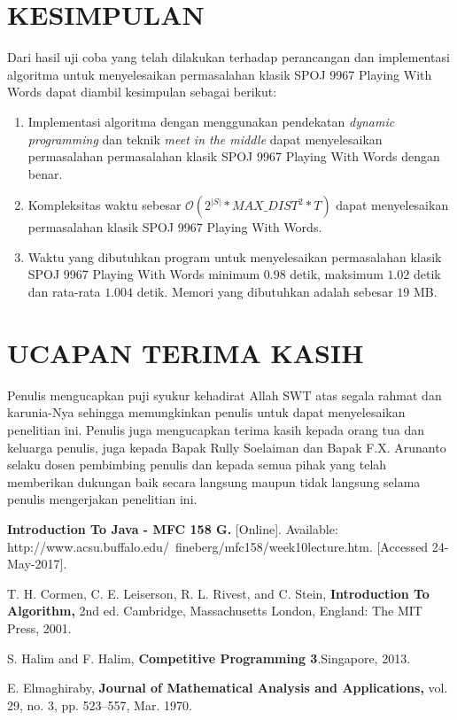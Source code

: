\documentclass[a4paper]{IEEEtran}
\begin{document}
\section{KESIMPULAN}

Dari hasil uji coba yang telah dilakukan terhadap perancangan dan implementasi algoritma untuk menyelesaikan permasalahan klasik SPOJ 9967 Playing With Words dapat diambil kesimpulan sebagai berikut:

\begin{enumerate}
	\item Implementasi algoritma dengan menggunakan pendekatan \textit{dynamic programming} dan teknik \textit{meet in the middle} dapat menyelesaikan permasalahan permasalahan klasik SPOJ 9967 Playing With Words dengan benar.
	\item Kompleksitas waktu sebesar $ \mathcal{O}(2^{|S|} * MAX\_DIST^{2} * T) $ dapat menyelesaikan permasalahan klasik SPOJ 9967 Playing With Words.
	\item Waktu yang dibutuhkan program untuk menyelesaikan permasalahan klasik SPOJ 9967 Playing With Words minimum $ 0.98 $ detik, maksimum $ 1.02 $ detik dan rata-rata $ 1.004 $ detik. Memori yang dibutuhkan adalah sebesar $ 19 $ MB.
\end{enumerate}

\section*{UCAPAN TERIMA KASIH}
Penulis mengucapkan puji syukur kehadirat Allah SWT atas segala rahmat dan karunia-Nya sehingga memungkinkan penulis untuk dapat menyelesaikan penelitian ini. Penulis juga mengucapkan terima kasih kepada orang tua dan keluarga penulis, juga kepada Bapak Rully Soelaiman dan Bapak F.X. Arunanto selaku dosen pembimbing penulis dan kepada semua pihak yang telah memberikan dukungan baik secara langsung maupun tidak langsung selama penulis mengerjakan penelitian ini.

\begin{thebibliography}{9}
	\textbf{Introduction To Java - MFC 158 G.} [Online]. Available: http://www.acsu.buffalo.edu/~fineberg/mfc158/week10lecture.htm. [Accessed 24-May-2017].		
	
	T. H. Cormen, C. E. Leiserson, R. L. Rivest, and C. Stein,
	\textbf{Introduction To Algorithm,} 2nd ed. Cambridge, Massachusetts London, England: The MIT Press, 2001.
	
	S. Halim and F. Halim,
	\textbf{ Competitive Programming 3}.Singapore, 2013.
	
	E. Elmaghiraby, \textbf{Journal of Mathematical Analysis and Applications,} vol. 29, no. 3, pp. 523–557, Mar. 1970.
\end{thebibliography}
\end{document}
